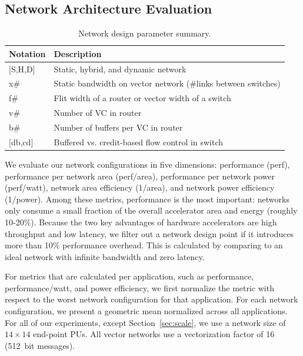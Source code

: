 \subsection{Network Architecture Evaluation} \label{sec:net_dse}

\begin{table}
\footnotesize
\begin{tabular*}{\columnwidth}{p{1cm} p{7cm}}
  \bottomrule
  \textbf{Notation} & \textbf{Description} \\\midrule
  $[$S,H,D$]$ & Static, hybrid, and dynamic network \\\midrule
  x\# & Static bandwidth on vector network (\#links between switches) \\\midrule
  f\# & Flit width of a router or vector width of a switch \\\midrule
  v\# & Number of VC in router \\\midrule
  b\# & Number of buffers per VC in router \\\midrule
  $[$db,cd$]$ & Buffered vs. credit-based flow control in switch \\\midrule
\end{tabular*}
\caption{Network design parameter summary.}
\label{tab:notation}
\end{table}
We evaluate our network configurations in five dimensions: performance (perf), performance per network area (perf/area), performance per network
power (perf/watt), network area efficiency (1/area), and network power efficiency (1/power). 
Among these metrics, performance is the most important: networks only consume a small fraction of the overall accelerator area and energy (roughly 10-20\%). 
Because the two key advantages of hardware accelerators are high throughput and low latency, 
we filter out a network design point if it introduces
more than 10\% performance overhead.
This is calculated by comparing to an ideal network with infinite bandwidth and zero latency.

For metrics that are calculated per application, such as performance, performance/watt, and power efficiency, we first normalize the metric with respect to the 
worst network configuration for that application. 
For each network configuration, we present a geometric mean normalized across all applications. 
For all of our experiments, except Section~\ref{sec:scale}, we use a network
size of $14\times14$ end-point PUs. All vector networks use a vectorization factor of 16 (\SI{512}{bit} messages).

